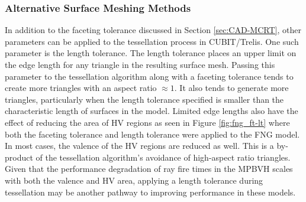 
\subsubsection{Alternative Surface Meshing Methods}

In addition to the faceting tolerance discussed in Section \ref{sec:CAD-MCRT},
other parameters can be applied to the tessellation process in CUBIT/Trelis. One
such parameter is the length tolerance. The length tolerance places an upper
limit on the edge length for any triangle in the resulting surface mesh. Passing
this parameter to the tessellation algorithm along with a faceting tolerance
tends to create more triangles with an aspect ratio $\approx 1$. It also tends
to generate more triangles, particularly when the length tolerance specified is
smaller than the characteristic length of surfaces in the model. Limited edge
lengths also have the effect of reducing the area of HV regions as seen in
Figure \ref{fig:fng_ft-lt} where both the faceting tolerance and length
tolerance were applied to the FNG model. In most cases, the valence of the HV
regions are reduced as well. This is a by-product of the tessellation
algorithm's avoidance of high-aspect ratio triangles. Given that the
performance degradation of ray fire times in the MPBVH scales with both the
valence and HV area, applying a length tolerance during tessellation may be
another pathway to improving performance in these models.

